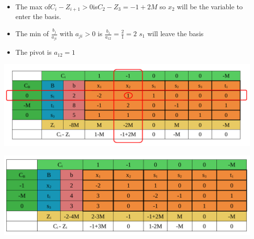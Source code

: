\vspace{0.25cm}
\begin{itemize}   
    \item The max of\hspace{0.2cm}\(C_i - Z_{i+1} > 0\)\hspace{0.2cm}is\hspace{0.2cm}\(C_2 - Z_3 = -1+2M\)\hspace{0.1cm} so \(x_2\) 
will be the variable to enter the basis.
\item The min of \hspace{0.1cm}\(\frac{b_j}{a_{ji}}\)\hspace{0.1cm} with \(a_{ji} > 0\)\hspace{0.1cm} is \hspace{0.1cm} \(\frac{b_1}{a_{12}} = \frac{2}{1} = 2\)\hspace{0.35cm} \(s_1\)
will leave the basis
\item The pivot is \(a_{12} = 1\)
 
\end{itemize}


\vspace{0.25cm}



\begin{center}
    \includegraphics{Chapters/Simplexe/EX/EX5/ex5.2.pdf}
\end{center}

\begin{center}
    \includegraphics{Chapters/Simplexe/EX/EX5/ex5.3.pdf}
\end{center}


